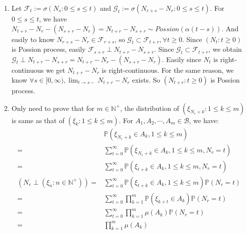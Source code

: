\documentclass[../main]{subfiles}
\begin{document}
\begin{solution}
  \begin{enumerate}
    \item
      Let \(\mathcal{F}_t:=\sigma(N_s:0 \leq s \leq t)\) and \(\mathcal{G}_t:=\sigma(N_{r+s}-N_r:0 \leq s \leq t)\).
      For \(0 \leq s \leq t\), we have \(N_{t+r}-N_r -(N_{s+r}-N_r)=N_{t+r}-N_{s+r} \sim Possion(\alpha(t-s))\).
      And easily to know \(N_{r + s}-N_r \in \mathcal{F}_{r+s}\), so \(\mathcal{G}_t \subset \mathcal{F}_{t+r},\forall t \geq 0\).
      Since \((N_t:t \geq 0)\) is Possion process, easily \(\mathcal{F}_{s+r} \perp N_{t+r}-N_{s+r}\).
      Since \(\mathcal{G}_{t}\subset \mathcal{F}_{t +r}\), we obtain \(\mathcal{G}_t \perp N_{t + r}-N_{s + r}=N_{t+r}-N_r -(N_{s+r}-N_r)\).
      Easily since \(N_t\) is right-continuous we get \(N_{t + r}-N_r\) is right-continuous.
      For the same reason, we know \(\forall s \in [0,\infty),\lim_{t \to s-}N_{t + r}-N_{r}\) exists.
      So \((N_{t+r}:t \geq 0)\) is Possion process.
    \item
      Only need to prove that for \(m \in \mathbb{N}^+\), the distribution of \((\xi_{N_r+k}:1 \leq k \leq m)\) is same as that of \((\xi_k:1 \leq k \leq m)\).
      For \(A_1,A_2,\cdots,A_m \in \mathcal{B}\), we have:
      \begin{equation}\label{equ:1}
        \begin{aligned}
                                                  & \mathbb{P}(\xi_{N_r+k}\in A_k,1 \leq k \leq m)                                       \\
          =                                       & \sum_{t=0}^{\infty} \mathbb{P}(\xi_{N_r + k} \in A_k,1 \leq k \leq m,N_r=t)          \\
          =                                       & \sum_{t=0}^{\infty} \mathbb{P}(\xi_{t + k} \in A_k,1 \leq k \leq m,N_r=t)            \\
          (N_r \perp (\xi_n:n \in \mathbb{N}^+))= & \sum_{t=0}^{\infty} \mathbb{P}(\xi_{t + k} \in A_k,1 \leq k \leq m)\mathbb{P}(N_r=t) \\
          =                                       & \sum_{t=0}^{\infty} \prod_{k=1}^{m} \mathbb{P}(\xi_{k+t} \in A_k)\mathbb{P}(N_r=t)   \\
          =                                       & \sum_{t=0}^{\infty} \prod_{k=1}^{m} \mu(A_k)\mathbb{P}(N_r=t)                        \\
          =                                       & \prod_{k=1}^{m} \mu(A_k)                                                             \\

\end{aligned}
\end{equation}
\end{enumerate}
\end{solution}
\end{document}
